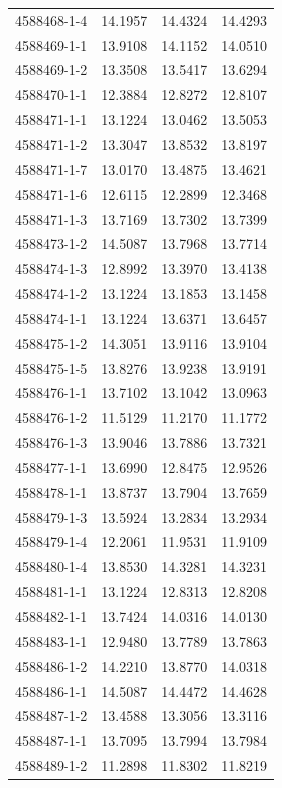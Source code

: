 \begin{longtable}{lrrr}
4588468-1-4 & 14.1957 & 14.4324 & 14.4293 \\
4588469-1-1 & 13.9108 & 14.1152 & 14.0510 \\
4588469-1-2 & 13.3508 & 13.5417 & 13.6294 \\
4588470-1-1 & 12.3884 & 12.8272 & 12.8107 \\
4588471-1-1 & 13.1224 & 13.0462 & 13.5053 \\
4588471-1-2 & 13.3047 & 13.8532 & 13.8197 \\
4588471-1-7 & 13.0170 & 13.4875 & 13.4621 \\
4588471-1-6 & 12.6115 & 12.2899 & 12.3468 \\
4588471-1-3 & 13.7169 & 13.7302 & 13.7399 \\
4588473-1-2 & 14.5087 & 13.7968 & 13.7714 \\
4588474-1-3 & 12.8992 & 13.3970 & 13.4138 \\
4588474-1-2 & 13.1224 & 13.1853 & 13.1458 \\
4588474-1-1 & 13.1224 & 13.6371 & 13.6457 \\
4588475-1-2 & 14.3051 & 13.9116 & 13.9104 \\
4588475-1-5 & 13.8276 & 13.9238 & 13.9191 \\
4588476-1-1 & 13.7102 & 13.1042 & 13.0963 \\
4588476-1-2 & 11.5129 & 11.2170 & 11.1772 \\
4588476-1-3 & 13.9046 & 13.7886 & 13.7321 \\
4588477-1-1 & 13.6990 & 12.8475 & 12.9526 \\
4588478-1-1 & 13.8737 & 13.7904 & 13.7659 \\
4588479-1-3 & 13.5924 & 13.2834 & 13.2934 \\
4588479-1-4 & 12.2061 & 11.9531 & 11.9109 \\
4588480-1-4 & 13.8530 & 14.3281 & 14.3231 \\
4588481-1-1 & 13.1224 & 12.8313 & 12.8208 \\
4588482-1-1 & 13.7424 & 14.0316 & 14.0130 \\
4588483-1-1 & 12.9480 & 13.7789 & 13.7863 \\
4588486-1-2 & 14.2210 & 13.8770 & 14.0318 \\
4588486-1-1 & 14.5087 & 14.4472 & 14.4628 \\
4588487-1-2 & 13.4588 & 13.3056 & 13.3116 \\
4588487-1-1 & 13.7095 & 13.7994 & 13.7984 \\
4588489-1-2 & 11.2898 & 11.8302 & 11.8219 \\

\end{longtable}
